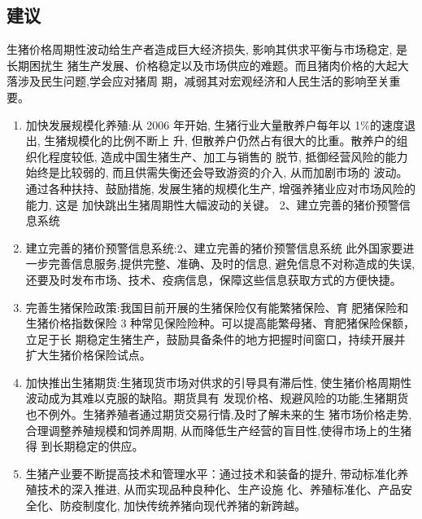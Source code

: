 \documentclass[a4paper,AutoFakeBold,AutoFakeSlant]{ctexart}
\begin{document}
\subsection{建议}
生猪价格周期性波动给生产者造成巨大经济损失, 影响其供求平衡与市场稳定, 是长期困扰生
猪生产发展、价格稳定以及市场供应的难题。而且猪肉价格的大起大落涉及民生问题,学会应对猪周
期，减弱其对宏观经济和人民生活的影响至关重要。
\begin{enumerate}
  \item 加快发展规模化养殖:从 2006 年开始, 生猪行业大量散养户每年以 1\%的速度退出, 生猪规模化的比例不断上
  升, 但散养户仍然占有很大的比重。散养户的组织化程度较低, 造成中国生猪生产、加工与销售的
  脱节, 抵御经营风险的能力始终是比较弱的, 而且供需失衡还会导致游资的介入, 从而加剧市场的
  波动。通过各种扶持、鼓励措施, 发展生猪的规模化生产, 增强养猪业应对市场风险的能力, 这是
  加快跳出生猪周期性大幅波动的关键。 2、建立完善的猪价预警信息系统
  \item 建立完善的猪价预警信息系统:2、建立完善的猪价预警信息系统 
  此外国家要进一步完善信息服务,提供完整、准确、及时的信息, 避免信息不对称造成的失误, 
  还要及时发布市场、技术、疫病信息，保障这些信息获取方式的方便快捷。
  \item 完善生猪保险政策:我国目前开展的生猪保险仅有能繁猪保险、育
  肥猪保险和生猪价格指数保险 3 种常见保险险种。可以提高能繁母猪、育肥猪保险保额，立足于长
  期稳定生猪生产，鼓励具备条件的地方把握时间窗口，持续开展并扩大生猪价格保险试点。
  \item 加快推出生猪期货:生猪现货市场对供求的引导具有滞后性, 使生猪价格周期性波动成为其难以克服的缺陷。期货具有
  发现价格、规避风险的功能,生猪期货也不例外。生猪养殖者通过期货交易行情,及时了解未来的生
  猪市场价格走势,合理调整养殖规模和饲养周期, 从而降低生产经营的盲目性,使得市场上的生猪得
  到长期稳定的供应。
  \item 生猪产业要不断提高技术和管理水平：通过技术和装备的提升, 带动标准化养殖技术的深入推进, 从而实现品种良种化、生产设施
  化、养殖标准化、产品安全化、防疫制度化, 加快传统养猪向现代养猪的新跨越。\cite{4月证监会近日批}
\end{enumerate}




\end{document}
